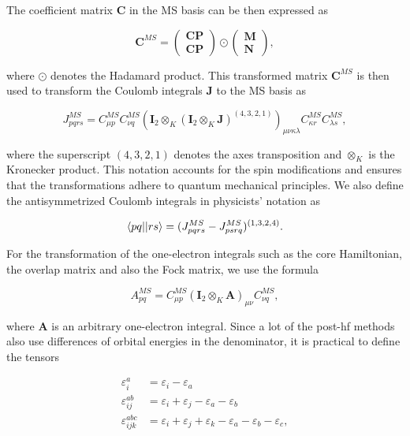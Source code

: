 The coefficient matrix \(\mathbf{C}\) in the MS basis can be then expressed as

\begin{equation}
\mathbf{C}^{MS}=
\begin{pmatrix}
\mathbf{CP} \\
\mathbf{CP}
\end{pmatrix}
\odot
\begin{pmatrix}
\mathbf{M} \\
\mathbf{N}
\end{pmatrix}
,
\end{equation}

where \(\odot\) denotes the Hadamard product. This transformed matrix \(\mathbf{C}^{MS}\) is then used to transform the Coulomb integrals \(\mathbf{J}\) to the MS basis as

\begin{equation}
J_{pqrs}^{MS}=C_{\mu p}^{MS}C_{\nu q}^{MS}(\mathbf{I}_{2}\otimes_K(\mathbf{I}_{2}\otimes_K\mathbf{J})^{(4,3,2,1)})_{\mu\nu\kappa\lambda}C_{\kappa r}^{MS}C_{\lambda s}^{MS},
\end{equation}

where the superscript \((4,3,2,1)\) denotes the axes transposition and \(\otimes_K\) is the Kronecker product. This notation accounts for the spin modifications and ensures that the transformations adhere to quantum mechanical principles. We also define the antisymmetrized Coulomb integrals in physicists' notation as

\begin{equation}
\braket{pq||rs}=(J_{pqrs}^{MS}-J_{psrq}^{MS})^{(1,3,2,4)}.
\end{equation}

For the transformation of the one-electron integrals such as the core Hamiltonian, the overlap matrix and also the Fock matrix, we use the formula

\begin{equation}
A_{pq}^{MS}=C_{\mu p}^{MS}(\mathbf{I}_{2}\otimes_K\mathbf{A})_{\mu\nu}C_{\nu q}^{MS},
\end{equation}

where \(\mathbf{A}\) is an arbitrary one-electron integral. Since a lot of the \acrshort{post-hf} methods also use differences of orbital energies in the denominator, it is practical to define the tensors

\begin{align}
\varepsilon^{a}_{i}&=\varepsilon_i-\varepsilon_a \\
\varepsilon^{ab}_{ij}&=\varepsilon_i+\varepsilon_j-\varepsilon_a-\varepsilon_b \\
\varepsilon^{abc}_{ijk}&=\varepsilon_i+\varepsilon_j+\varepsilon_k-\varepsilon_a-\varepsilon_b-\varepsilon_c,
\end{align}

